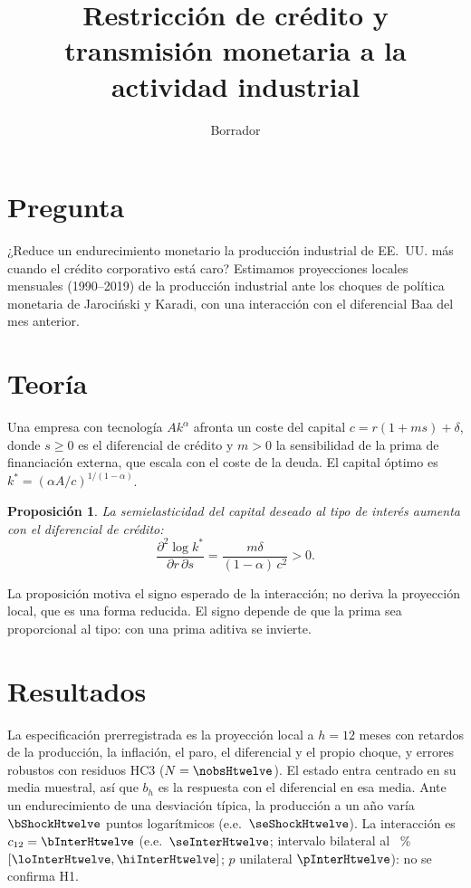 \documentclass[11pt]{article}
\title{Restricción de crédito y transmisión monetaria a la actividad industrial}
\date{Borrador}
\newtheorem{proposition}{Proposición}
\begin{document}
\maketitle

\section{Pregunta}
¿Reduce un endurecimiento monetario la producción industrial de EE.~UU. más cuando el crédito corporativo está caro?
Estimamos proyecciones locales mensuales (1990--2019) de la producción industrial ante los choques de política monetaria
de Jarociński y Karadi, con una interacción con el diferencial Baa del mes anterior.

\section{Teoría}
Una empresa con tecnología $A k^\alpha$ afronta un coste del capital $c = r(1 + m s) + \delta$, donde $s \geq 0$ es el
diferencial de crédito y $m > 0$ la sensibilidad de la prima de financiación externa, que escala con el coste de la
deuda. El capital óptimo es $k^* = (\alpha A / c)^{1/(1-\alpha)}$.

\begin{proposition}
La semielasticidad del capital deseado al tipo de interés aumenta con el diferencial de crédito:
\[
  \frac{\partial^2 \log k^*}{\partial r \, \partial s} = \frac{m \delta}{(1-\alpha)\, c^2} > 0 .
\]
\end{proposition}

La proposición motiva el signo esperado de la interacción; no deriva la proyección local, que es una forma reducida.
El signo depende de que la prima sea proporcional al tipo: con una prima aditiva se invierte.

\section{Resultados}
La especificación prerregistrada es la proyección local a $h = 12$ meses con \lags{} retardos de la producción, la
inflación, el paro, el diferencial y el propio choque, y errores robustos con residuos HC3 ($N = \nobsHtwelve$). El
estado entra centrado en su media muestral, así que $b_h$ es la respuesta con el diferencial en esa media. Ante un
endurecimiento de una desviación típica, la producción a un año varía $\bShockHtwelve$ puntos logarítmicos
(e.e.~$\seShockHtwelve$). La interacción es $c_{12} = \bInterHtwelve$ (e.e.~$\seInterHtwelve$; intervalo bilateral al
\ciLevel{}~\% $[\loInterHtwelve, \hiInterHtwelve]$; $p$ unilateral $\pInterHtwelve$): no se confirma H1.
\end{document}
